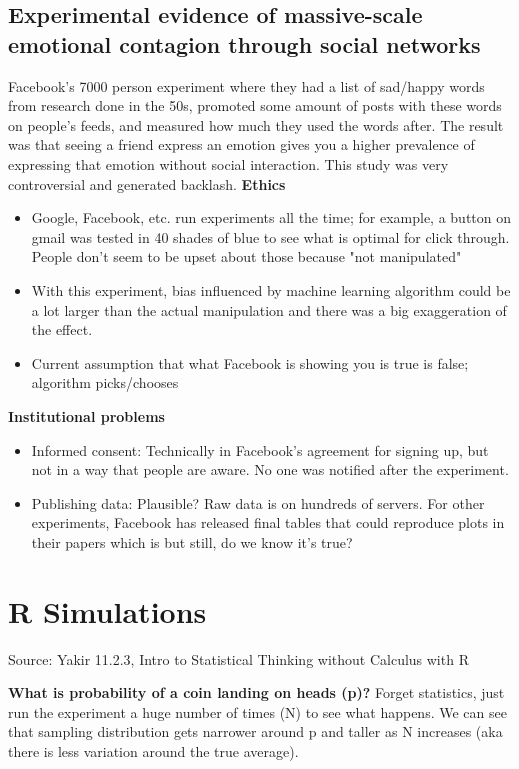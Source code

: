 \subsection{Experimental evidence of massive-scale emotional contagion through social networks}
Facebook's 7000 person experiment where they had a list of sad/happy words from research done in the 50s, promoted some amount of posts with these words on people's feeds, and measured how much they used the words after. The result was that seeing a friend express an emotion gives you a higher prevalence of expressing that emotion without social interaction. This study was very controversial and generated backlash. \newline
\textbf{Ethics }
\begin{itemize}
\item Google, Facebook, etc. run experiments all the time; for example, a button on gmail was tested in 40 shades of blue to see what is optimal for click through. People don't seem to be upset about those because "not manipulated"
\item With this experiment, bias influenced by machine learning algorithm could be a lot larger than the actual manipulation and there was a big exaggeration of the effect. 
\item Current assumption that what Facebook is showing you is true is false; algorithm picks/chooses 
\end{itemize}
\textbf{Institutional problems}
\begin{itemize}
\item Informed consent: Technically in Facebook's agreement for signing up, but not in a way that people are aware. No one was notified after the experiment.
\item Publishing data: Plausible? Raw data is on hundreds of servers. For other experiments, Facebook has released final tables that could reproduce plots in their papers which is but still, do we know it's true?
\end{itemize}
\section{R Simulations}
Source: Yakir 11.2.3, Intro to Statistical Thinking without Calculus with R \newline

\textbf{What is probability of a coin landing on heads (p)?} Forget statistics, just run the experiment a huge number of times (N) to see what happens. We can see that sampling distribution gets narrower around p and taller as N increases (aka there is less variation around the true average). \newline

